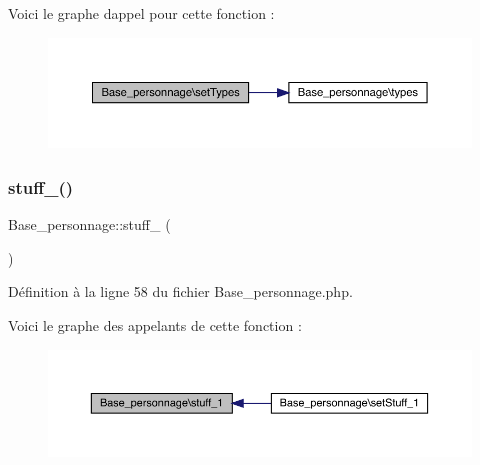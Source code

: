 Voici le graphe d\textquotesingle{}appel pour cette fonction \+:\nopagebreak
\begin{figure}[H]
\begin{center}
\leavevmode
\includegraphics[width=350pt]{class_base__personnage_aa3d0dbf11be8d919e4faa6e7f110375e_cgraph}
\end{center}
\end{figure}
\mbox{\label{class_base__personnage_aad70521301b01ab3918bea05bef7b54b}} 
\subsubsection{\texorpdfstring{stuff\+\_()}{stuff\_1()}}
{\footnotesize\ttfamily Base\+\_\+personnage\+::stuff\+\_ (\begin{DoxyParamCaption}{ }\end{DoxyParamCaption})}



Définition à la ligne 58 du fichier Base\+\_\+personnage.\+php.

Voici le graphe des appelants de cette fonction \+:\nopagebreak
\begin{figure}[H]
\begin{center}
\leavevmode
\includegraphics[width=350pt]{class_base__personnage_aad70521301b01ab3918bea05bef7b54b_icgraph}
\end{center}
\end{figure}
\mbox{\label{class_base__personnage_ae37a88e0e1535ff5f0d786c1007fbe1e}} 
